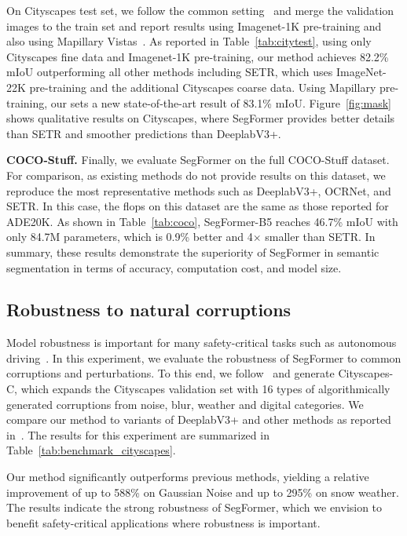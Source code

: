 On Cityscapes test set, we follow the common setting~\cite{deeplabv3+} and merge the validation images to the train set and report results using Imagenet-1K pre-training and also using Mapillary Vistas~\cite{mv}. As reported in Table~\ref{tab:citytest},
using only Cityscapes fine data and Imagenet-1K pre-training, our method achieves 82.2\% mIoU outperforming all other methods including SETR, which uses ImageNet-22K pre-training and the additional Cityscapes coarse data. Using Mapillary pre-training, our sets a new state-of-the-art result of 83.1\% mIoU.
Figure~\ref{fig:mask} shows qualitative results on Cityscapes, where SegFormer provides better details than SETR and smoother predictions than DeeplabV3+.

\textbf{COCO-Stuff.}
Finally, we evaluate SegFormer on the full COCO-Stuff dataset. For comparison, as existing methods do not provide results on this dataset, we reproduce the most representative methods such as DeeplabV3+, OCRNet, and SETR. In this case, the flops on this dataset are the same as those reported for ADE20K. As shown in Table~\ref{tab:coco}, SegFormer-B5 reaches 46.7\% mIoU with only 84.7M parameters, which is 0.9\% better and 4$\times$ smaller than SETR. In summary, these results demonstrate the superiority of SegFormer in semantic segmentation in terms of accuracy, computation cost, and model size.

\subsection{Robustness to natural corruptions} Model robustness is important for many safety-critical tasks such as autonomous driving~\cite{robust}. In this experiment, we evaluate the robustness of SegFormer to common corruptions and perturbations. To this end, we follow~\cite{robust} and generate Cityscapes-C, which expands the Cityscapes validation set with 16 types of algorithmically generated corruptions from noise, blur, weather and digital categories. We compare our method to variants of DeeplabV3+ and other methods as reported in~\cite{robust}. The results for this experiment are summarized in Table~\ref{tab:benchmark_cityscapes}.

Our method significantly outperforms previous methods, yielding a relative improvement of up to 588\% on Gaussian Noise and up to 295\% on snow weather. The results indicate the strong robustness of SegFormer, which we envision to benefit safety-critical applications where robustness is important.

